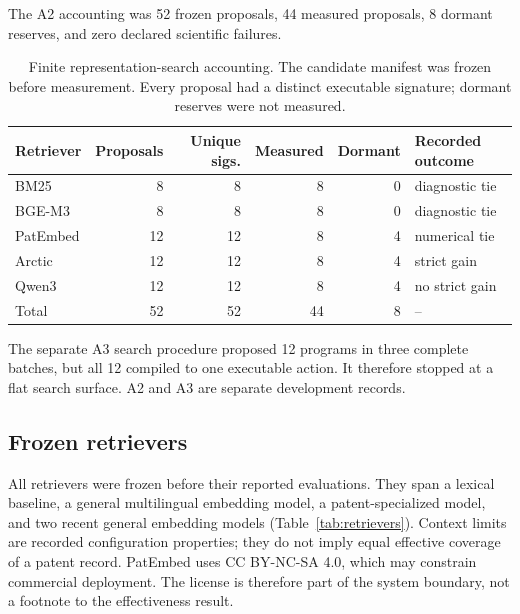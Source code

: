 \documentclass[final,5p,times,twocolumn]{elsarticle}
\newenvironment{widejournal}{\begin{table}[!t]}{\end{table}}
\newcommand{\journalTableFont}{\footnotesize}
\newenvironment{widejournal}{\begin{table}[!htbp]}{\end{table}}
\newcommand{\journalTableFont}{\footnotesize}
\begin{document}
The A2 accounting was 52 frozen proposals, 44 measured proposals, 8 dormant
reserves, and zero declared scientific failures.

\begin{widejournal}
\caption{Finite representation-search accounting. The candidate manifest was
frozen before measurement. Every proposal had a distinct executable
signature; dormant reserves were not measured.}
\label{tab:search-accounting}
\centering
\journalTableFont
\scriptsize
\setlength{\tabcolsep}{2pt}
\sloppy
\begin{tabularx}{\textwidth}{@{}P{1.8cm}r r r r Y@{}}
\toprule
Retriever & Proposals & Unique sigs. & Measured & Dormant & Recorded outcome \\
\midrule
BM25 & 8 & 8 & 8 & 0 & diagnostic tie \\
BGE-M3 & 8 & 8 & 8 & 0 & diagnostic tie \\
PatEmbed & 12 & 12 & 8 & 4 & numerical tie \\
Arctic & 12 & 12 & 8 & 4 & strict gain \\
Qwen3 & 12 & 12 & 8 & 4 & no strict gain \\
Total & 52 & 52 & 44 & 8 & -- \\
\bottomrule
\end{tabularx}
\end{widejournal}

The separate A3 search procedure proposed 12 programs in three complete
batches, but all 12 compiled to one executable action. It therefore stopped
at a flat search surface. A2 and A3 are separate development records.

\subsection{Frozen retrievers}

All retrievers were frozen before their reported evaluations. They span a lexical
baseline, a general multilingual embedding model, a patent-specialized model,
and two recent general embedding models (Table~\ref{tab:retrievers}). Context limits
are recorded configuration properties; they do not imply equal effective
coverage of a patent record. PatEmbed uses CC BY-NC-SA 4.0, which may constrain
commercial deployment. The license is therefore part of the system boundary,
not a footnote to the effectiveness result.
\end{document}
